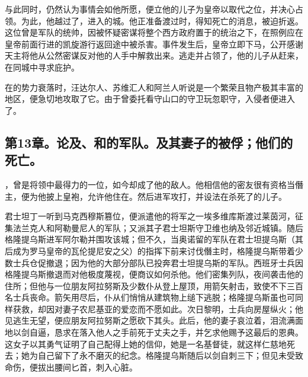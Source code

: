 与此同时，仍然认为事情会如他所愿，便立他的儿子为皇帝以取代之位，并决心占领。为此，他越过了，进入的城。他正准备渡过时，得知死亡的消息，被迫折返。这位曾是军队的统帅，因被怀疑密谋将整个西方政府置于的统治之下，在照例应在皇帝前面行进的凯旋游行返回途中被杀害。事件发生后，皇帝立即下马，公开感谢天主将他从公然密谋反对他的人手中解救出来。逃走并占领了，他的儿子从赶来，在同城中寻求庇护。\par

在的势力衰落时，汪达尔人、苏维汇人和阿兰人听说是一个繁荣且物产极其丰富的地区，便急切地攻取了它。由于曾委托看守山口的守卫玩忽职守，入侵者便进入了。\par


\subsection{第13章。论及、和的军队。及其妻子的被俘；他们的死亡。}

，曾是将领中最得力的一位，如今却成了他的敌人。他相信他的密友很有资格当僭主，便为他披上皇袍，允许他住在。然后进军攻打，并设法在杀死了的儿子。\par

君士坦丁一听到马克西穆斯篡位，便派遣他的将军之一埃多维库斯渡过莱茵河，征集法兰克人和阿勒曼尼人的军队；又派其子君士坦斯守卫维也纳及邻近城镇。随后格隆提乌斯进军阿尔勒并围攻该城；但不久，当奥诺留的军队在君士坦提乌斯（其后成为罗马皇帝的瓦伦提尼安之父）的指挥下前来讨伐僭主时，格隆提乌斯带着少数士兵仓促撤退；因为他的大部分部队已投奔君士坦提乌斯的军队。西班牙士兵因格隆提乌斯撤退而对他极度蔑视，便商议如何杀他。他们密集列队，夜间袭击他的住所；但他与一位朋友阿拉努斯及少数仆从登上屋顶，用箭矢射击，致使不下三百名士兵丧命。箭矢用尽后，仆从们悄悄从建筑物上缒下逃脱；格隆提乌斯虽也可同样获救，却因对妻子农尼基亚的爱恋而不愿如此。次日黎明，士兵向房屋纵火；他见逃生无望，便应朋友阿拉努斯之愿砍下其头。此后，他的妻子哀泣着，泪流满面地以剑自逼，恳求在落入他人之手前死于丈夫之手，并乞求他赐予这最后的恩典。这女子以其勇气证明了自己配得上她的信仰，她是一名基督徒，就这样仁慈地死去；她为自己留下了永不磨灭的纪念。格隆提乌斯随后以剑自刺三下；但见未受致命伤，便拔出腰间匕首，刺入心脏。\par


